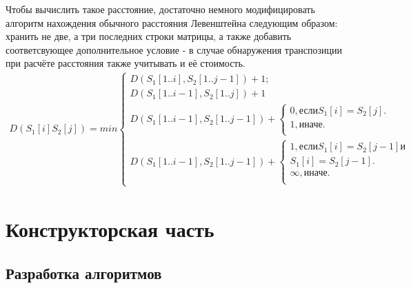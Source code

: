 \documentclass[a4paper]{article}
\begin{document}
	Чтобы вычислить такое расстояние, достаточно немного модифицировать алгоритм нахождения обычного расстояния Левенштейна следующим образом: хранить  не две, а три последних строки матрицы, а также добавить соответсвующее дополнительное условие - в случае обнаружения транспозиции при расчёте расстояния также учитывать и её стоимость.
	\begin{multline}
		D(S_1[i]S_2[j]) = min 
		\begin{cases}
			D(S_1[1..i], S_2[1..j-1]) + 1;\\
			D(S_1[1..i-1], S_2[1..j]) + 1\\
			D(S_1[1..i-1], S_2[1..j-1]) + \begin{cases}
				0, \text {если}  S_1[i] = S_2[j].\\
				1, \text{иначе}.\\
			\end{cases}\\
			D(S_1[1..i-1], S_2[1..j-1])+ \begin{cases}
				1, \text {если} S_1[i] = S_2[j-1] \text{и}\\
				                S_1[i]=S_2[j-1].\\
				\infty, \text{иначе}.\\
			\end{cases}	
		\end{cases}
		\label{formula_2}
	\end{multline}

	\clearpage
	\section{Конструкторская часть}
	\subsection{Разработка алгоритмов}
\end{document}

